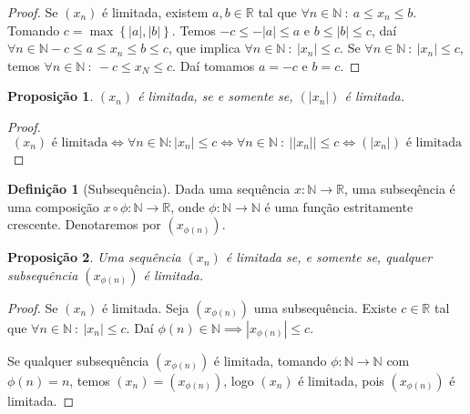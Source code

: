 \documentclass{article}
\theoremstyle{plain}
\newtheorem{prop}{Proposição}[section]
\theoremstyle{definition}
\newtheorem{definicao}{Definição}[section]
\theoremstyle{remark}
\begin{document}
   \begin{proof}
	   Se $(x_n)$ é limitada, existem $a,b\in \mathbb{R}$ tal que $\forall n \in \mathbb{N} \: : \: a\leq x_n \leq b $. Tomando $c = \max\left\{ |a|, |b| \right\}$. Temos $ -c \leq -|a| \leq a $ e $b \leq |b| \leq c$, daí  $\forall n \in \mathbb{N} -c \leq a \leq  x_n  \leq b \leq c$, que implica $\forall n \in \mathbb{N} \: : \: |x_n| \leq c$.
	   Se $\forall n \in \mathbb{N} \: : \: |x_n| \leq c$, temos  $\forall n \in \mathbb{N} \: : \: -c \leq x_N \leq c$. Daí tomamos $a = -c$ e $b = c$.
   \end{proof}
   \begin{prop}
	   $(x_n)$ é limitada, se e somente se,   $(|x_n|)$ é limitada.
   \end{prop}
   \begin{proof}
	   $$(x_n) \text{ é limitada} \iff \forall n \in \mathbb{N} :   |x_n| \leq c \iff \forall n \in \mathbb{N} \: : \: ||x_n|| \leq c \iff (|x_n|) \text{ é limitada} $$
   \end{proof}
   \begin{definicao}[Subsequência]
	   Dada uma sequência $x: \mathbb{N} \to \mathbb{R}$, uma subseqência é uma composição $x \circ \phi : \mathbb{N} \to \mathbb{R}$, onde  $\phi : \mathbb{N} \to \mathbb{N}$ é uma função estritamente crescente. Denotaremos por $(x_{\phi(n)})$.
   \end{definicao}
\begin{prop}
	Uma sequência $(x_n)$ é limitada se, e somente se, qualquer subsequência $(x_{\phi(n)})$ é limitada.
\end{prop}
\begin{proof}
	Se $(x_n)$ é limitada. Seja $(x_{\phi(n)})$ uma subsequência. Existe $c\in \mathbb{R}$ tal que $\forall n\in \mathbb{N} \: : \: |x_n| \leq c$. Daí $\phi(n) \in \mathbb{N} \implies |x_{\phi(n)}| \leq c$.
	
	Se qualquer subsequência $(x_{\phi(n)})$ é limitada, tomando $\phi:\mathbb{N} \to \mathbb{N}$ com $\phi(n) = n$, temos $(x_n) = (x_{\phi(n)})$, logo $(x_n)$ é limitada, pois $(x_{\phi(n)})$ é limitada.
\end{proof}
\end{document}
